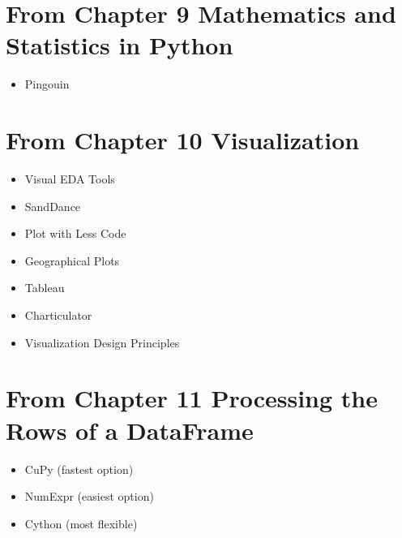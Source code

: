 \documentclass[letterpaper,10pt,english]{jupyterBook}
\begin{document}
\section{From Chapter 9 \sphinxhyphen{} Mathematics and Statistics in Python}
\label{\detokenize{loyo-list:from-chapter-9-mathematics-and-statistics-in-python}}\begin{itemize}
\item {} 
\sphinxAtStartPar
Pingouin

\end{itemize}


\section{From Chapter 10 \sphinxhyphen{} Visualization}
\label{\detokenize{loyo-list:from-chapter-10-visualization}}\begin{itemize}
\item {} 
\sphinxAtStartPar
Visual EDA Tools

\item {} 
\sphinxAtStartPar
SandDance

\item {} 
\sphinxAtStartPar
Plot with Less Code

\item {} 
\sphinxAtStartPar
Geographical Plots

\item {} 
\sphinxAtStartPar
Tableau

\item {} 
\sphinxAtStartPar
Charticulator

\item {} 
\sphinxAtStartPar
Visualization Design Principles

\end{itemize}


\section{From Chapter 11 \sphinxhyphen{} Processing the Rows of a DataFrame}
\label{\detokenize{loyo-list:from-chapter-11-processing-the-rows-of-a-dataframe}}\begin{itemize}
\item {} 
\sphinxAtStartPar
CuPy (fastest option)

\item {} 
\sphinxAtStartPar
NumExpr (easiest option)

\item {} 
\sphinxAtStartPar
Cython (most flexible)

\end{itemize}
\end{document}
